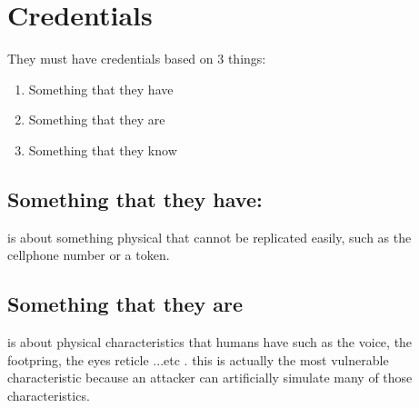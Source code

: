 \documentclass[10pt,a4paper]{article} %
\begin{document}
        \section{Credentials}
            They must have credentials based on 3 things:
        \begin{enumerate}
            \item {Something that they have} 
            \item {Something that they are} 
            \item {Something that they know} 
        \end{enumerate}
        \subsection{Something that they have:}
            is about something physical that cannot be replicated
            easily, such as the cellphone number or a token. 

        \subsection{Something that they are}
            is about physical characteristics that humans have such as the
            voice, the footpring, the eyes reticle ...etc . this is actually the
            most vulnerable characteristic because an attacker can artificially
            simulate many of those characteristics.
\end{document}
